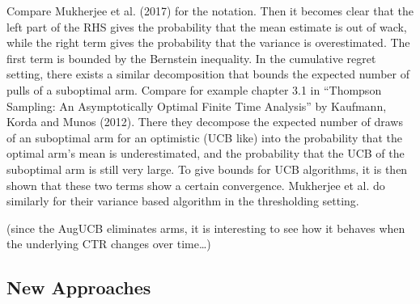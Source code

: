 \documentclass[12pt,]{article}
\begin{document}
Compare Mukherjee et al. (2017) for the notation. Then it becomes clear
that the left part of the RHS gives the probability that the mean
estimate is out of wack, while the right term gives the probability that
the variance is overestimated. The first term is bounded by the
Bernstein inequality. In the cumulative regret setting, there exists a
similar decomposition that bounds the expected number of pulls of a
suboptimal arm. Compare for example chapter 3.1 in ``Thompson Sampling:
An Asymptotically Optimal Finite Time Analysis'' by Kaufmann, Korda and
Munos (2012). There they decompose the expected number of draws of an
suboptimal arm for an optimistic (UCB like) into the probability that
the optimal arm's mean is underestimated, and the probability that the
UCB of the suboptimal arm is still very large. To give bounds for UCB
algorithms, it is then shown that these two terms show a certain
convergence. Mukherjee et al. do similarly for their variance based
algorithm in the thresholding setting.

(since the AugUCB eliminates arms, it is interesting to see how it
behaves when the underlying CTR changes over time\ldots{})

\subsection{New Approaches}\label{new-approaches}
\end{document}
